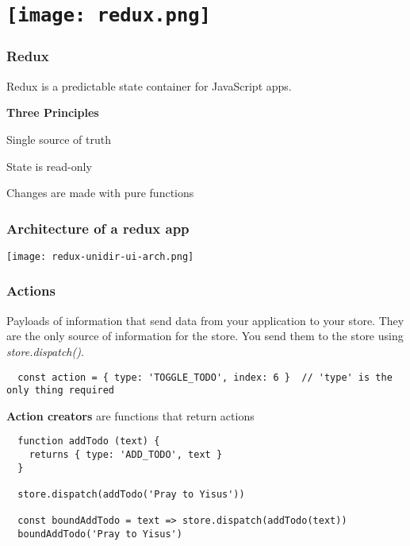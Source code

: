 \section{\texorpdfstring{\texttt{[image: redux.png]}}{Redux}}

\begin{frame}

  \frametitle{Redux}
  Redux is a predictable state container for JavaScript apps.

	\textbf{Three Principles}

	Single source of truth

	State is read-only

	Changes are made with pure functions 

\end{frame}

\begin{frame}

  \frametitle{Architecture of a redux app}
	\texttt{[image: redux-unidir-ui-arch.png]}

\end{frame}

\begin{frame}[fragile]
	\frametitle{Actions}
  Payloads of information that send data from your application to your store. They are the only source of information for the store. You send them to the store using \textit{store.dispatch()}.

	\begin{verbatim}
  const action = { type: 'TOGGLE_TODO', index: 6 }  // 'type' is the only thing required
	\end{verbatim}

  \textbf{Action creators} are functions that return actions

	\begin{verbatim}
  function addTodo (text) {
    returns { type: 'ADD_TODO', text }
  }

  store.dispatch(addTodo('Pray to Yisus'))

  const boundAddTodo = text => store.dispatch(addTodo(text))
  boundAddTodo('Pray to Yisus')
	\end{verbatim}

\end{frame}

